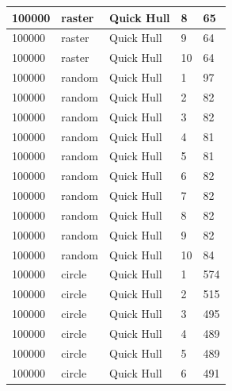 \documentclass[12pt]{article}
\begin{document}
\begin{longtable}{|l|l|l|l|l|}
100000       & raster            & Quick Hull & 8          & 65                            \\ \hline
100000       & raster            & Quick Hull & 9          & 64                            \\ \hline
100000       & raster            & Quick Hull & 10         & 64                            \\ \hline
100000       & random            & Quick Hull & 1          & 97                            \\ \hline
100000       & random            & Quick Hull & 2          & 82                            \\ \hline
100000       & random            & Quick Hull & 3          & 82                            \\ \hline
100000       & random            & Quick Hull & 4          & 81                            \\ \hline
100000       & random            & Quick Hull & 5          & 81                            \\ \hline
100000       & random            & Quick Hull & 6          & 82                            \\ \hline
100000       & random            & Quick Hull & 7          & 82                            \\ \hline
100000       & random            & Quick Hull & 8          & 82                            \\ \hline
100000       & random            & Quick Hull & 9          & 82                            \\ \hline
100000       & random            & Quick Hull & 10         & 84                            \\ \hline
100000       & circle            & Quick Hull & 1          & 574                           \\ \hline
100000       & circle            & Quick Hull & 2          & 515                           \\ \hline
100000       & circle            & Quick Hull & 3          & 495                           \\ \hline
100000       & circle            & Quick Hull & 4          & 489                           \\ \hline
100000       & circle            & Quick Hull & 5          & 489                           \\ \hline
100000       & circle            & Quick Hull & 6          & 491                           \\ \hline

\end{longtable}
\end{document}
